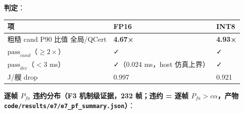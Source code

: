 \textbf{判定}：

{\def\LTcaptype{none} %
\begin{longtable}[]{@{}lll@{}}
\toprule\noalign{}
项 & FP16 & INT8 \\
\midrule\noalign{}
\endhead
\bottomrule\noalign{}
\endlastfoot
粗糙 cand P90 比值 全局/QCert & \textbf{4.67×} & \textbf{4.93×} \\
\(\mathrm{pass}_{cand}\)（\(\ge2\times\)） & ✓ & ✓ \\
\(\mathrm{pass}_{dec}\)（\(<3\) ms） & ✓（0.024 ms，host 仿真上界） &
✓ \\
J/艘 drop & 0.997 & 0.921 \\
\end{longtable}
}

\textbf{逐帧 \(P_{fa}\) 违约分布（F3 机制级证据，232 帧；违约 = 逐帧
\(P_{fa}>c\alpha\)，产物
\texttt{code/results/e7/e7\_pf\_summary.json}）}：

